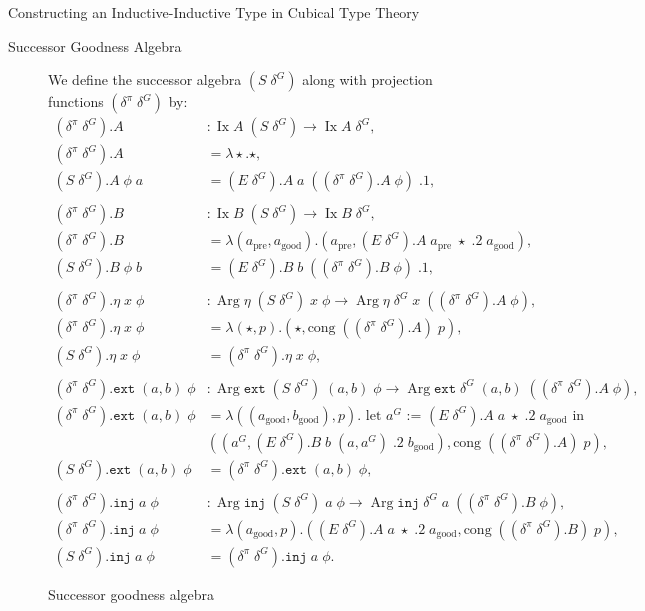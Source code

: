 \documentclass[runningheads]{llncs}
\DeclareMathOperator{\Arg}{Arg}
\DeclareMathOperator{\Ix}{Ix}
\newcommand{\pre}[1]{{#1}_\text{pre}}
\newcommand{\good}[1]{{#1}_\text{good}}
\newcommand{\join}{\texttt{ext}}
\newcommand{\inj}{\texttt{inj}}
\begin{document}
\begin{section}{Constructing an Inductive-Inductive Type in Cubical Type Theory}
\begin{subsection}{Successor Goodness Algebra}
\begin{figure}[htpb]
\begin{flushleft}
We define the successor algebra $(S\;\delta^G)$ along with projection functions $(\delta^\pi\;\delta^G)$ by:
\begin{align*}
(\delta^\pi\;\delta^G).A &: \Ix A\;(S\;\delta^G) \to \Ix A\;\delta^G,\\
(\delta^\pi\;\delta^G).A &= \lambda \star. \star,\\
(S\;\delta^G).A\;\phi\;a &= (E\;\delta^G).A\;a\;((\delta^\pi\;\delta^G).A\;\phi)\;.1,\\
\\[-.15in]
(\delta^\pi\;\delta^G).B &: \Ix B\;(S\;\delta^G) \to \Ix B\;\delta^G,\\
(\delta^\pi\;\delta^G).B &= \lambda (\pre{a}, \good{a}). (\pre{a}, (E\;\delta^G).A\;\pre{a}\;\star\;.2\;\good{a}),\\
(S\;\delta^G).B\;\phi\;b &= (E\;\delta^G).B\;b\;((\delta^\pi\;\delta^G).B\;\phi)\;.1,\\
\\[-.15in]
(\delta^\pi\;\delta^G).\eta\;x\;\phi &: \Arg\eta\;(S\;\delta^G)\;x\;\phi \to \Arg\eta\;\delta^G\;x\;((\delta^\pi\;\delta^G).A\;\phi),\\
(\delta^\pi\;\delta^G).\eta\;x\;\phi &= \lambda(\star, p).(\star, \text{cong}\;((\delta^\pi\;\delta^G).A)\;p),\\
(S\;\delta^G).\eta\;x\;\phi &= (\delta^\pi\;\delta^G).\eta\;x\;\phi,\\
\\[-.15in]
(\delta^\pi\;\delta^G).\join\;(a, b)\;\phi &: \Arg\join\;(S\;\delta^G)\; (a, b)\;\phi \to \Arg\join\;\delta^G\;(a, b)\;((\delta^\pi\;\delta^G).A\;\phi),\\
(\delta^\pi\;\delta^G).\join\;(a, b)\;\phi &= \lambda((\good{a}, \good{b}), p).\text{ let $a^G$ := $(E\;\delta^G).A\;a\;\star\;.2\;\good{a}$ in}\\& ((a^G, (E\;\delta^G).B\;b\;(a, a^G)\;.2\;\good{b}), \text{cong}\;((\delta^\pi\;\delta^G).A)\;p),\\
(S\;\delta^G).\join\;(a, b)\;\phi &= (\delta^\pi\;\delta^G).\join\;(a, b)\;\phi,\\
\\[-.15in]
(\delta^\pi\;\delta^G).\inj\;a\;\phi &: \Arg\inj\;(S\;\delta^G)\;a\;\phi \to \Arg\inj\;\delta^G\;a\;((\delta^\pi\;\delta^G).B\;\phi),\\
(\delta^\pi\;\delta^G).\inj\;a\;\phi &= \lambda(\good{a}, p). ((E\;\delta^G).A\;a\;\star\;.2\;\good{a}, \text{cong}\;((\delta^\pi\;\delta^G).B)\;p),\\
(S\;\delta^G).\inj\;a\;\phi &= (\delta^\pi\;\delta^G).\inj\;a\;\phi.
\end{align*}
\end{flushleft}
\caption{\label{example-successor-algebra-def}Successor goodness algebra}
\end{figure}


\end{subsection}
\end{section}
\end{document}
